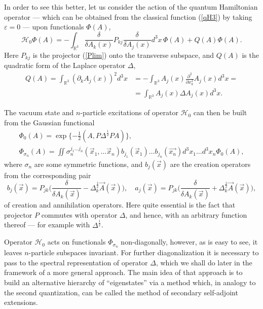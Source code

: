 \documentclass[12pt]{article}
\newcommand{\pl}{\partial}
\newcommand{\HH}{\mathscr{H}}
\newcommand{\RR}{\mathbb{R}}
\newcommand{\ve}{\varepsilon}
\begin{document}
	In order to see this better, let us consider the action
	of the quantum Hamiltonian operator --- which can be obtained from
	the classical function
(\ref{qH3})
	by taking
$ \ve = 0 $ ---
	upon functionals
$ \Phi(A) $,
\begin{equation}
\label{qH0}
    \HH_{0}\Phi(A) = - \int_{\RR^{3}} \frac{\delta}{\delta A_{k}(x)}
	P_{kj} \frac{\delta}{\delta A_{j}(x)} d^{3}x \,\Phi(A)
	+ Q(A) \Phi(A) .
\end{equation}
	Here
$ P_{kj} $
	is the projector
(\ref{Plim})
	onto the transverse subspace, and
$ Q(A) $
	is the quadratic form of the Laplace operator
$ \Delta $,
\begin{align}
\nonumber
    Q(A) = \int_{\RR^{3}} (\pl_{k}A_{j}(x))^{2} d^{3}x
	&= - \int_{\RR^{3}} A_{j}(x) \frac{\pl^{2}}{\pl x_{k}^{2}} A_{j}(x)
	    d^{3} x =\\
\label{QA}
	&= \int_{\RR^{3}} A_{j}(x) \Delta A_{j}(x) d^{3}x .
\end{align}

	The vacuum state and
$ n $-particle excitations of operator
$ \HH_{0} $
	can then be built from the Gaussian functional
\begin{gather}
\label{Phi0}
    \Phi_{0}(A) = \exp\{-\frac{1}{2}(A,P\Delta^{\frac{1}{2}}PA)\} ,\\
\label{Phin}
    \Phi_{\sigma_{n}}(A) = \iint
    \sigma_{n}^{j_{1}\ldots j_{n}} (\vec{x}_{1},\ldots \vec{x}_{n})
	b_{j_{1}}(\vec{x}_{1}) \ldots b_{j_{n}}(\vec{x_{n}})
    d^{3}x_{1} \ldots d^{3}x_{n} \Phi_{0}(A) ,
\end{gather}
	where
$ \sigma_{n} $ are some symmetric functions, and
$ b_{j}(\vec{x}) $ are the creation operators from the corresponding pair
\begin{equation*}
    b_{j}(\vec{x}) = P_{jk}\bigl(\frac{\delta}{\delta A_{k}(\vec{x})}
	- \Delta^{\frac{1}{2}}_{k}\vec{A}(\vec{x})\bigr) ,\quad
    a_{j}(\vec{x}) = P_{jk}\bigl(\frac{\delta}{\delta A_{k}(\vec{x})}
	+ \Delta^{\frac{1}{2}}_{k}\vec{A}(\vec{x})\bigr) ,
\end{equation*}
    	of creation and annihilation operators.
	Here quite essential is the fact that projector
$ P $
	commutes with operator
$ \Delta $,
	and hence, with an arbitrary function thereof ---
	for example with 
$ \Delta^{\frac{1}{2}} $.

	Operator
$ \HH_{0} $
	acts on functionals
$ \Phi_{\sigma_{n}} $
	non-diagonally, however, as is easy to see,
	it leaves
$ n $-particle subspaces invariant.
	For further diagonalization it is necessary to pass
	to the spectral representation of operator
$ \Delta $,
	which we shall do later in the framework of a more general approach.
	The main idea of that approach is
	to build an alternative hierarchy of ``eigenstates'' via a method
	which, in analogy to the second quantization, can be called
	the method of secondary self-adjoint extensions.
\end{document}
